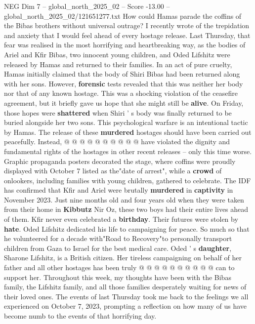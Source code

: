 \begin{textsample}{NEG Dim 7 – global\_north\_2025\_02 – Score -13.00 – global\_north\_2025\_02/121651277.txt}  \label{ex:f7_neg_061}
How could Hamas parade the coffins of the Bibas brothers without universal outrage?
I recently wrote of the trepidation and anxiety that I would feel ahead of every hostage release.
Last Thursday, that fear was realised in the most horrifying and heartbreaking way, as the bodies of Ariel and Kfir Bibas, two innocent young children, and Oded Lifshitz were released by Hamas and returned to their families.
In an act of pure cruelty, Hamas initially claimed that the body of Shiri Bibas had been returned along with her sons.
However, \textbf{forensic} tests revealed that this was neither her body nor that of any known hostage.
This was a shocking violation of the ceasefire agreement, but it briefly gave us hope that she might still be \textbf{alive}.
On Friday, those hopes were \textbf{shattered} when Shiri ' s body was finally returned to be buried alongside her two sons.
This psychological warfare is an intentional tactic by Hamas.
The release of these \textbf{murdered} hostages should have been carried out peacefully.
Instead, @ @ @ @ @ @ @ @ @ @ have violated the dignity and fundamental rights of the hostages in other recent releases -- only this time worse.
Graphic propaganda posters decorated the stage, where coffins were proudly displayed with October 7 listed as the"date of arrest", while a \textbf{crowd} of onlookers, including families with young children, gathered to celebrate.
The IDF has confirmed that Kfir and Ariel were brutally \textbf{murdered} in \textbf{captivity} in November 2023.
Just nine months old and four years old when they were taken from their home in \textbf{Kibbutz} Nir Oz, these two boys had their entire lives ahead of them.
Kfir never even celebrated a \textbf{birthday}.
Their futures were stolen by \textbf{hate}.
Oded Lifshitz dedicated his life to campaigning for peace.
So much so that he volunteered for a decade with"Road to Recovery"to personally transport children from Gaza to Israel for the best medical care.
Oded ' s \textbf{daughter}, Sharone Lifshitz, is a British citizen.
Her tireless campaigning on behalf of her father and all other hostages has been truly @ @ @ @ @ @ @ @ @ @ can to support her.
Throughout this week, my thoughts have been with the Bibas family, the Lifshitz family, and all those families desperately waiting for news of their loved ones.
The events of last Thursday took me back to the feelings we all experienced on October 7, 2023, prompting a reflection on how many of us have become numb to the events of that horrifying day.

\end{textsample}
